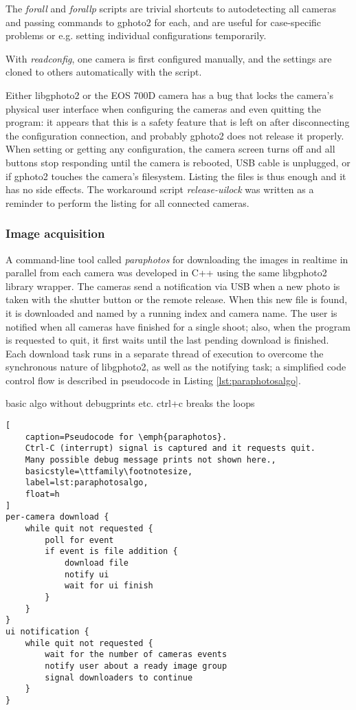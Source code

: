 The \emph{forall} and \emph{forallp} scripts are trivial shortcuts to autodetecting all cameras and passing commands to gphoto2 for each, and are useful for case-specific problems or e.g. setting individual configurations temporarily.

With \emph{readconfig}, one camera is first configured manually, and the settings are cloned to others automatically with the script.

Either libgphoto2 or the EOS 700D camera has a bug that locks the camera's physical user interface when configuring the cameras and even quitting the program:
it appears that this is a safety feature that is left on after disconnecting the configuration connection, and probably gphoto2 does not release it properly.
When setting or getting any configuration, the camera screen turns off and all buttons stop responding until the camera is rebooted, USB cable is unplugged, or if gphoto2 touches the camera's filesystem.
Listing the files is thus enough and it has no side effects.
The workaround script \emph{release-uilock} was written as a reminder to perform the listing for all connected cameras.


\subsubsection{Image acquisition} %


A command-line tool called \emph{paraphotos} for downloading the images in realtime in parallel from each camera was developed in C++ using the same libgphoto2 library wrapper.
The cameras send a notification via USB when a new photo is taken with the shutter button or the remote release.
When this new file is found, it is downloaded and named by a running index and camera name.
The user is notified when all cameras have finished for a single shoot;
also, when the program is requested to quit, it first waits until the last pending download is finished.
Each download task runs in a separate thread of execution to overcome the synchronous nature of libgphoto2, as well as the notifying task; a simplified code control flow is described in pseudocode in Listing \ref{lst:paraphotosalgo}.

basic algo without debugprints etc.
ctrl+c breaks the loops
\begin{lstlisting}[
	caption=Pseudocode for \emph{paraphotos}.
	Ctrl-C (interrupt) signal is captured and it requests quit.
	Many possible debug message prints not shown here.,
	basicstyle=\ttfamily\footnotesize,
	label=lst:paraphotosalgo,
	float=h
]
per-camera download {
	while quit not requested {
		poll for event
		if event is file addition {
			download file
			notify ui
			wait for ui finish
		}
	}
}
ui notification {
	while quit not requested {
		wait for the number of cameras events
		notify user about a ready image group
		signal downloaders to continue
	}
}
\end{lstlisting}


